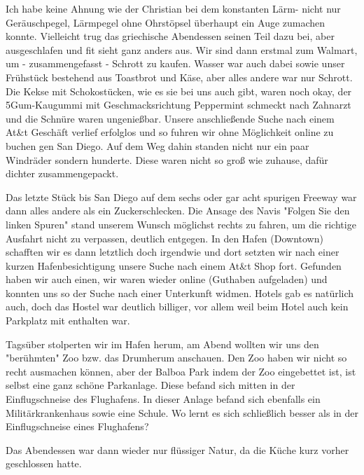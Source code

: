 Ich habe keine Ahnung wie der Christian bei dem konstanten Lärm- nicht nur Geräuschpegel, Lärmpegel ohne Ohrstöpsel überhaupt ein Auge zumachen konnte.
Vielleicht trug das griechische Abendessen seinen Teil dazu bei, aber ausgeschlafen und fit sieht ganz anders aus.
Wir sind dann erstmal zum Walmart, um - zusammengefasst - Schrott zu kaufen.
Wasser war auch dabei sowie unser Frühstück bestehend aus Toastbrot und Käse, aber alles andere war nur Schrott.
Die Kekse mit Schokostücken, wie es sie bei uns auch gibt, waren noch okay, der 5Gum-Kaugummi mit Geschmacksrichtung Peppermint schmeckt nach Zahnarzt und die Schnüre waren ungenießbar.
Unsere anschließende Suche nach einem At\&t Geschäft verlief erfolglos und so fuhren wir ohne Möglichkeit online zu buchen gen San Diego.
Auf dem Weg dahin standen nicht nur ein paar Windräder sondern hunderte.
Diese waren nicht so groß wie zuhause, dafür dichter zusammengepackt.

Das letzte Stück bis San Diego auf dem sechs oder gar acht spurigen Freeway war dann alles andere als ein Zuckerschlecken.
Die Ansage des Navis "Folgen Sie den linken Spuren" stand unserem Wunsch möglichst rechts zu fahren, um die richtige Ausfahrt nicht zu verpassen, deutlich entgegen.
In den Hafen (Downtown) schafften wir es dann letztlich doch irgendwie und dort setzten wir nach einer kurzen Hafenbesichtigung unsere Suche nach einem At\&t Shop fort.
Gefunden haben wir auch einen, wir waren wieder online (Guthaben aufgeladen) und konnten uns so der Suche nach einer Unterkunft widmen.
Hotels gab es natürlich auch, doch das Hostel war deutlich billiger, vor allem weil beim Hotel auch kein Parkplatz mit enthalten war.

Tagsüber stolperten wir im Hafen herum, am Abend wollten wir uns den "berühmten" Zoo bzw. das Drumherum anschauen.
Den Zoo haben wir nicht so recht ausmachen können, aber der Balboa Park indem der Zoo eingebettet ist, ist selbst eine ganz schöne Parkanlage.
Diese befand sich mitten in der Einflugschneise des Flughafens.
In dieser Anlage befand sich ebenfalls ein Militärkrankenhaus sowie eine Schule.
Wo lernt es sich schließlich besser als in der Einflugschneise eines Flughafens?

Das Abendessen war dann wieder nur flüssiger Natur, da die Küche kurz vorher geschlossen hatte.
